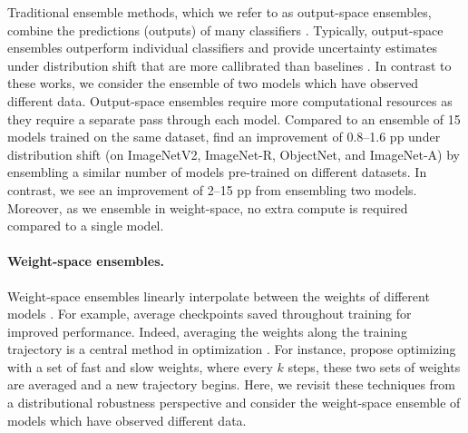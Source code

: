 Traditional ensemble methods, which we refer to as output-space ensembles, combine the predictions (outputs) of many classifiers \cite{dietterich2000ensemble, bauer1999empirical, breiman1996bagging,friedman2001elements, deepensembles, FREUND1997119}. 
Typically, output-space ensembles outperform individual classifiers and
provide uncertainty estimates under distribution shift that are more callibrated than baselines \cite{deepensembles,ovadia2019can,stickland2020diverse}. In contrast to these works, we consider the ensemble of two models which have observed different data.
Output-space ensembles require more computational resources as they require a separate pass through each model.
Compared to an ensemble of 15 models trained on the same dataset, \citet{mustafa2020deep} find an improvement of 0.8--1.6 pp  under distribution shift (on ImageNetV2, ImageNet-R, ObjectNet, and ImageNet-A) by ensembling a similar number of models pre-trained on different datasets.
In contrast, we see an improvement of 2--15 pp from ensembling two models. Moreover, as we ensemble in weight-space, no extra compute is required compared to a single model.

\paragraph{Weight-space ensembles.}

Weight-space ensembles linearly interpolate between the weights of different models \cite{frankle2020linear, lucas2021analyzing, goodfellow2014qualitatively, szegedy2016rethinking}. For example, \citet{izmailov2018averaging} average checkpoints saved throughout training for improved performance.
Indeed, averaging the weights along the training trajectory is a central method in optimization \cite{ruppert1988efficient, polyak1992acceleration, nichol2018first}.
For instance, \citet{zhang2019lookahead} propose optimizing with a set of fast and slow weights, where every $k$ steps, these two sets of weights are averaged and a new trajectory begins.
Here, we revisit these techniques from a distributional robustness perspective and consider the weight-space ensemble of models which have observed different data. 

